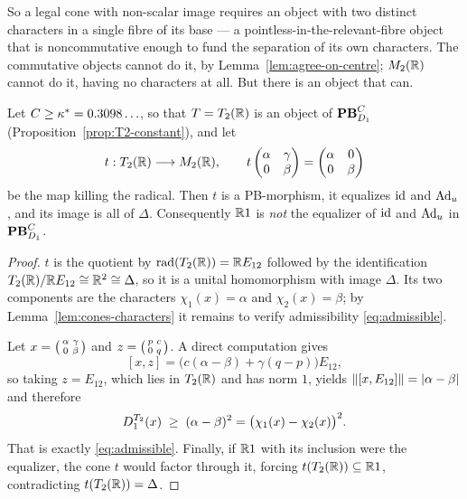 So a legal cone with non-scalar image requires an object with two distinct
characters in a single fibre of its base --- a pointless-in-the-relevant-fibre
object that is noncommutative enough to fund the separation of its own
characters.  The commutative objects cannot do it, by
Lemma~\ref{lem:agree-on-centre}; $M_2(\mathbb{R})$ cannot do it, having no characters
at all.  But there is an object that can.

\begin{theorem}
\label{thm:t2-cone}
Let $C\ge\kappa^*=0.3098\ldots$, so that $T=T_2(\mathbb{R})$ is an object of
$\mathbf{PB}^C_{D_1}$ (Proposition~\ref{prop:T2-constant}), and let
\[
  t:T_2(\mathbb{R})\longrightarrow M_2(\mathbb{R}),
  \qquad
  t\begin{pmatrix}\alpha&\gamma\\0&\beta\end{pmatrix}
  =\begin{pmatrix}\alpha&0\\0&\beta\end{pmatrix}
\]
be the map killing the radical.  Then $t$ is a PB-morphism, it equalizes $\operatorname{id}$
and $\operatorname{Ad}_u$, and its image is all of $\Delta$.  Consequently $\mathbb{R}1$ is
\emph{not} the equalizer of $\operatorname{id}$ and $\operatorname{Ad}_u$ in $\mathbf{PB}^C_{D_1}$.
\end{theorem}

\begin{proof}
$t$ is the quotient by $\operatorname{rad}(T_2(\mathbb{R}))=\mathbb{R} E_{12}$ followed by the identification
$T_2(\mathbb{R})/\mathbb{R} E_{12}\cong\mathbb{R}^2\cong\Delta$, so it is a unital homomorphism with
image $\Delta$.  Its two components are the characters
$\chi_1(x)=\alpha$ and $\chi_2(x)=\beta$; by Lemma~\ref{lem:cones-characters} it
remains to verify admissibility \eqref{eq:admissible}.

Let $x=\begin{psmallmatrix}\alpha&\gamma\\0&\beta\end{psmallmatrix}$ and
$z=\begin{psmallmatrix}p&c\\0&q\end{psmallmatrix}$.  A direct computation gives
\[
  [x,z]=\bigl(c(\alpha-\beta)+\gamma(q-p)\bigr)E_{12},
\]
so taking $z=E_{12}$, which lies in $T_2(\mathbb{R})$ and has norm $1$, yields
$\left\lVert[x,E_{12}]\right\rVert=\left\lvert\alpha-\beta\right\rvert$ and therefore
\[
  D_1^{T_2}(x)\;\ge\;(\alpha-\beta)^2=\bigl(\chi_1(x)-\chi_2(x)\bigr)^2 .
\]
That is exactly \eqref{eq:admissible}.  Finally, if $\mathbb{R}1$ with its inclusion
were the equalizer, the cone $t$ would factor through it, forcing
$t(T_2(\mathbb{R}))\subseteq\mathbb{R}1$, contradicting $t(T_2(\mathbb{R}))=\Delta$.
\end{proof}

